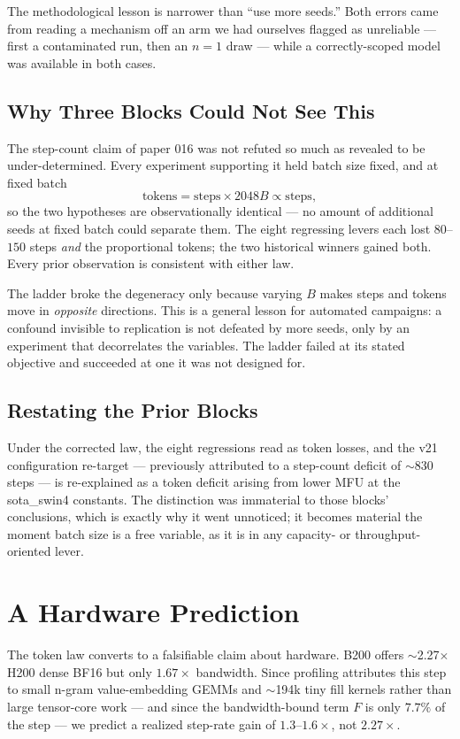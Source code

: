 \documentclass{article}
\begin{document}
The methodological lesson is narrower than ``use more seeds.'' Both errors came from reading a mechanism off an arm we had ourselves flagged as unreliable --- first a contaminated run, then an $n{=}1$ draw --- while a correctly-scoped model was available in both cases.

\subsection{Why Three Blocks Could Not See This}
The step-count claim of paper 016 was not refuted so much as revealed to be under-determined. Every experiment supporting it held batch size fixed, and at fixed batch
\[
\mathrm{tokens} = \mathrm{steps} \times 2048B \propto \mathrm{steps},
\]
so the two hypotheses are observationally identical --- no amount of additional seeds at fixed batch could separate them. The eight regressing levers each lost $80$--$150$ steps \emph{and} the proportional tokens; the two historical winners gained both. Every prior observation is consistent with either law.

The ladder broke the degeneracy only because varying $B$ makes steps and tokens move in \emph{opposite} directions. This is a general lesson for automated campaigns: a confound invisible to replication is not defeated by more seeds, only by an experiment that decorrelates the variables. The ladder failed at its stated objective and succeeded at one it was not designed for.

\subsection{Restating the Prior Blocks}
Under the corrected law, the eight regressions read as token losses, and the v21 configuration re-target --- previously attributed to a step-count deficit of $\sim$830 steps --- is re-explained as a token deficit arising from lower MFU at the sota\_swin4 constants. The distinction was immaterial to those blocks' conclusions, which is exactly why it went unnoticed; it becomes material the moment batch size is a free variable, as it is in any capacity- or throughput-oriented lever.

\section{A Hardware Prediction}
The token law converts to a falsifiable claim about hardware. B200 offers $\sim$2.27$\times$ H200 dense BF16 but only $1.67\times$ bandwidth. Since profiling attributes this step to small n-gram value-embedding GEMMs and $\sim$194k tiny fill kernels rather than large tensor-core work --- and since the bandwidth-bound term $F$ is only $7.7\%$ of the step --- we predict a realized step-rate gain of $1.3$--$1.6\times$, not $2.27\times$.
\end{document}
